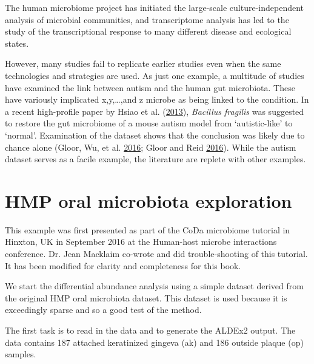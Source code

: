\documentclass[onecolumn]{book}
\theoremstyle{definition}
\theoremstyle{definition}
\theoremstyle{definition}
\theoremstyle{remark}
\begin{document}
The human microbiome project has initiated the large-scale
culture-independent analysis of microbial communities, and transcriptome
analysis has led to the study of the transcriptional response to many
different disease and ecological states.

However, many studies fail to replicate earlier studies even when the
same technologies and strategies are used. As just one example, a
multitude of studies have examined the link between autism and the human
gut microbiota. These have variously implicated x,y,\ldots{},and z
microbe as being linked to the condition. In a recent high-profile paper
by Hsiao et al. (\protect\hyperlink{ref-Hsiao:2013}{2013}),
\emph{Bacillus fragilis} was suggested to restore the gut microbiome of
a mouse autism model from `autistic-like' to `normal'. Examination of
the dataset shows that the conclusion was likely due to chance alone
(Gloor, Wu, et al. \protect\hyperlink{ref-gloor2016s}{2016}; Gloor and
Reid \protect\hyperlink{ref-Gloor:2016cjm}{2016}). While the autism
dataset serves as a facile example, the literature are replete with
other examples.

\hypertarget{oral}{%
\chapter{HMP oral microbiota exploration}\label{oral}}

\hspace{2cm}\begin{minipage}[ct]{10cm}
\parskip=5pt
\parindent=5pt
This example was first presented as part of the CoDa microbiome tutorial in Hinxton, UK in September 2016 at the Human-host microbe interactions conference. Dr. Jean Macklaim co-wrote and did trouble-shooting of this tutorial. It has been modified for clarity and completeness for this book.
\end{minipage}
\vspace{1cm}

We start the differential abundance analysis using a simple dataset
derived from the original HMP oral microbiota dataset. This dataset is
used because it is exceedingly sparse and so a good test of the method.

The first task is to read in the data and to generate the ALDEx2 output.
The data contains 187 attached keratinized gingeva (ak) and 186 outside
plaque (op) samples.
\end{document}
